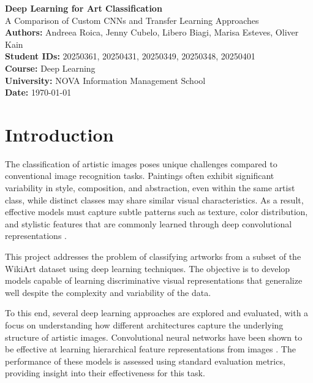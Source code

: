 \documentclass[12pt,a4paper]{article}
\begin{document}
\begin{titlepage}
    \centering
    \vspace*{3cm}
    
    {\LARGE \textbf{Deep Learning for Art Classification}}\\[0.5cm]
    {\large A Comparison of Custom CNNs and Transfer Learning Approaches}\\[5cm]
    
    \textbf{Authors:} Andreea Roica, Jenny Cubelo, Libero Biagi, Marisa Esteves, Oliver Kain \\
    \textbf{Student IDs:} 20250361, 20250431, 20250349, 20250348, 20250401 \\
    \textbf{Course:} Deep Learning \\
    \textbf{University:} NOVA Information Management School \\
    \textbf{Date:} \today
    
    \vfill
\end{titlepage}

\tableofcontents
\newpage

\section{Introduction}

The classification of artistic images poses unique challenges compared to conventional image recognition tasks. 
Paintings often exhibit significant variability in style, composition, and abstraction, even within the same artist class, while distinct classes may share similar visual characteristics.
 As a result, effective models must capture subtle patterns such as texture, color distribution, and stylistic features that are commonly learned through deep convolutional representations \cite{cetinic2018finetuning,li2024artimage}.

This project addresses the problem of classifying artworks from a subset of the WikiArt dataset using deep learning techniques. 
The objective is to develop models capable of learning discriminative visual representations that generalize well despite the complexity and variability of the data.

To this end, several deep learning approaches are explored and evaluated, with a focus on understanding how different architectures capture the underlying structure of artistic images. 
Convolutional neural networks have been shown to be effective at learning hierarchical feature representations from images \cite{cetinic2018finetuning}. 
The performance of these models is assessed using standard evaluation metrics, providing insight into their effectiveness for this task.
\end{document}
